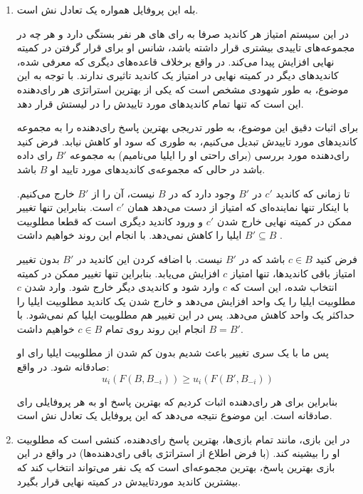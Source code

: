 \documentclass[12pt]{article}
\begin{document}
\begin{enumerate}
    \item {

        بله این پروفایل همواره یک تعادل نش است.
        
        در این سیستم امتیاز هر کاندید صرفا به رای های هر نفر بستگی دارد و هر چه در 
        مجموعه‌های تاییدی بیشتری قرار داشته باشد، 
        شانس او برای قرار گرفتن در کمیته نهایی افزایش
        پیدا می‌کند. در واقع برخلاف قاعده‌های
         دیگری که معرفی شده، کاندیدهای دیگر در کمیته نهایی در
        امتیاز یک کاندید تاثیری ندارند. با توجه به این موضوع، به طور شهودی
        مشخص است که یکی از بهترین استراتژی هر رای‌دهنده این است که تنها تمام کاندیدهای
        مورد تاییدش را در لیستش قرار دهد.

        برای اثبات دقیق این موضوع، به طور تدریجی بهترین پاسخ رای‌دهنده را به مجموعه
        کاندیدهای مورد تاییدش تبدیل می‌کنیم، به طوری که سود او کاهش نیابد. فرض کنید
        رای‌دهنده مورد بررسی 
        (برای راحتی او را ایلیا می‌نامیم)
        به مجموعه $B'$
        رای داده باشد در حالی که مجموعه‌ی کاندیدهای مورد تایید او $B$ 
        باشد.

        تا زمانی که کاندید $c'$ 
        در $B'$ 
        وجود دارد که در $B$ 
        نیست، آن را از $B'$ 
        خارج می‌کنیم. با اینکار تنها نماینده‌ای که امتیاز از دست می‌دهد 
        همان $c'$
        است. بنابراین تنها تغییر ممکن در کمیته نهایی خارج شدن 
        $c'$
        و ورود کاندید دیگری است که قطعا مطلوبیت ایلیا را کاهش نمی‌دهد.
        با انجام این روند خواهیم داشت
        $B' \subseteq B $
        .
        
        فرض کنید $c \in B$
        باشد که در $B'$
        نیست. با اضافه کردن این کاندید در $B'$
        بدون تغییر امتیاز باقی کاندیدها، تنها امتیاز $c$
        افزایش می‌یابد. بنابراین تنها تغییر ممکن در کمیته انتخاب شده، 
        این است که $c$ وارد شود و کاندیدی دیگر خارج شود. وارد شدن
        $c$
        مطلوبیت ایلیا را یک واحد افزایش می‌دهد و خارج شدن یک کاندید مطلوبیت ایلیا
        را حداکثر یک واحد کاهش می‌دهد. پس در این تغییر هم مطلوبیت ایلیا کم
        نمی‌شود. با انجام این روند روی تمام $c \in B$
        خواهیم داشت $B = B'$.

        پس ما با یک سری تغییر باعث شدیم بدون کم شدن از مطلوبیت ایلیا
        رای او صادقانه شود. در واقع:
        \[
        u_i(F(B, B_{-i})) \ge u_i(F(B',B_{-i}))
        \]

        بنابراین برای هر رای‌دهنده اثبات کردیم که بهترین پاسخ او به هر پروفایلی
        رای صادقانه است. این موضوع نتیجه می‌دهد که این پروفایل یک تعادل نش
        است.
        }
        \item {
            در این بازی، مانند تمام بازی‌ها، بهترین پاسخ رای‌دهنده، کنشی
            است که مطلوبیت او را بیشینه کند. 
            (با فرض اطلاع از استراتژی باقی رای‌دهنده‌ها)
            در واقع در این بازی بهترین پاسخ، بهترین مجموعه‌ای است که 
            یک نفر می‌تواند انتخاب کند که بیشترین کاندید موردتاییدش
            در کمیته نهایی قرار بگیرد.

}
\end{enumerate}
\end{document}
